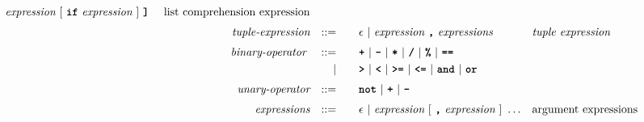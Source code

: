 \begin{alignat*}{9}
                                            \textit{expression} \ [ \ \textbf{\texttt{if}} \ \textit{expression} \ ]  \ \textbf{\texttt{]}} \ && \textrm{list comprehension expression}\\[1mm]
&& \textit{tuple-expression}   && ::= &\quad &&  \epsilon \ | \ \textit{expression} \ \textbf{\texttt{,}} \ \textit{expressions}  && \textit{tuple expression}  \\[1mm]
&& \textit{binary-operator}    \ 
                        && ::= &\quad && \textbf{\texttt{+}}\ |\ \textbf{\texttt{-}}\ |\ \textbf{\texttt{*}}\ |\ \textbf{\texttt{/}}\ |\ \textbf{\texttt{\%}}\ |\ 
                                   \textbf{\texttt{==}}\ \\ %
&&                       && |  &\quad &&  \texttt{\textbf{>}}\ |\ \texttt{\textbf{<}}\ |\ \texttt{\textbf{>=}}\ |\ \texttt{\textbf{<=}}\
                                          |\ \textbf{\texttt{and}}\ |\ \texttt{\textbf{or}}\  \\[1mm]
&& \textit{unary-operator}    
                        && ::= &\quad && \textbf{\texttt{not}}\ |\ \textbf{\texttt{+}}\ |\ \textbf{\texttt{-}} \\[1mm]
&& \textit{expressions}  && ::= &\quad && \epsilon\ | \ \textit{expression}\ [
                                                               \ \textbf{\texttt{,}} \
                                                                 \textit{expression} \ 
                                                                      ]\ \ldots
                                                            && \textrm{argument expressions}
\end{alignat*}

\newpage